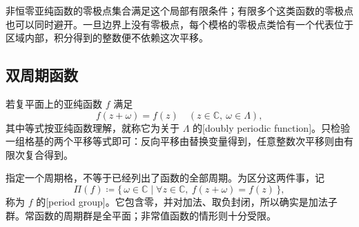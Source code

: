非恒零亚纯函数的零极点集合满足这个局部有限条件；有限多个这类函数的零极点也可以同时避开。一旦边界上没有零极点，每个模格的零极点类恰有一个代表位于区域内部，积分得到的整数便不依赖这次平移。

\subsection{双周期函数}
\label{b3:subsec:220103}

若复平面上的亚纯函数 \(f\) 满足
\[
 f(z+\omega)=f(z)\quad(z\in\mathbb C,\ \omega\in\Lambda),
\]
其中等式按亚纯函数理解，就称它为关于 \(\Lambda\) 的[doubly periodic function]。只检验一组格基的两个平移等式即可：反向平移由替换变量得到，任意整数次平移则由有限次复合得到。

\ProseParagraphBreak
指定一个周期格，不等于已经列出了函数的全部周期。为区分这两件事，记
\[
 \Pi(f)\coloneqq\{\,\omega\in\mathbb C\mid
 \forall z\in\mathbb C,\ f(z+\omega)=f(z)\,\},
\]
称为 \(f\) 的[period group]。它包含零，并对加法、取负封闭，所以确实是加法子群。常函数的周期群是全平面；非常值函数的情形则十分受限。

